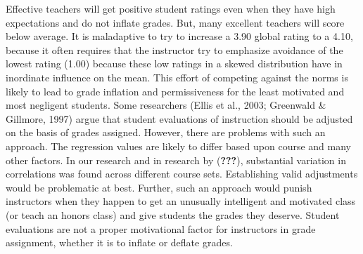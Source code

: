 \documentclass[,man]{apa6}
\theoremstyle{definition}
\theoremstyle{definition}
\theoremstyle{definition}
\theoremstyle{remark}
\begin{document}
Effective teachers will get positive student ratings even when they have
high expectations and do not inflate grades. But, many excellent
teachers will score below average. It is maladaptive to try to increase
a 3.90 global rating to a 4.10, because it often requires that the
instructor try to emphasize avoidance of the lowest rating (1.00)
because these low ratings in a skewed distribution have in inordinate
influence on the mean. This effort of competing against the norms is
likely to lead to grade inflation and permissiveness for the least
motivated and most negligent students. Some researchers (Ellis et al.,
2003; Greenwald \& Gillmore, 1997) argue that student evaluations of
instruction should be adjusted on the basis of grades assigned. However,
there are problems with such an approach. The regression values are
likely to differ based upon course and many other factors. In our
research and in research by ({\textbf{???}}), substantial variation in
correlations was found across different course sets. Establishing valid
adjustments would be problematic at best. Further, such an approach
would punish instructors when they happen to get an unusually
intelligent and motivated class (or teach an honors class) and give
students the grades they deserve. Student evaluations are not a proper
motivational factor for instructors in grade assignment, whether it is
to inflate or deflate grades.
\end{document}
